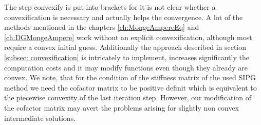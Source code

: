 The step convexify is put into brackets for it is not clear whether a convexification is necessary and actually helps the convergence. A lot of the methods mentioned in the chapters \ref{ch:MongeAmpereEq} and \ref{ch:DGMongeAmpere} work without an explicit convexification, although most require a convex initial guess. 
Additionally the approach described in section \ref{subsec: convexification} is intricately to implement, increases significantly the computation costs and it may modify functions even though they already are convex. We note, that for the condition of the stiffness matrix of the used SIPG method we need the cofactor matrix to be positive definit which is equivalent to the piecewise convexity of the last iteration step. However, our modification of the cofactor matrix  may avert the problems arising for slightly non convex intermediate solutions.
